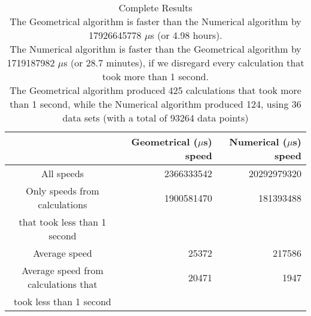 \begin{table}[bth!]\footnotesize
 \begin{tabular}[3]{c|r|r}
 & Geometrical ($\mu$s) speed & Numerical ($\mu$s) speed\\
\hline
All speeds & 2366333542 & 20292979320 \\ 
\hline 
Only speeds from calculations & 1900581470 & 181393488 \\ 
that took less than 1 second & & \\ 
\hline
Average speed & 25372 & 217586 \\
\hline
Average speed from calculations that & 20471 & 1947 \\ 
took less than 1 second & & \\ 
\end{tabular}\\ \\
\caption{Complete  Results\\
The Geometrical algorithm is faster than the Numerical algorithm by 17926645778 $\mu$s (or 4.98 hours).\\
The Numerical algorithm is faster than the Geometrical algorithm by 1719187982 $\mu$s (or 28.7 minutes), if we disregard every calculation that took more than 1 second.\\
The Geometrical algorithm produced 425 calculations that took more than 1 second, while the Numerical algorithm produced 124, using 36 data sets (with a total of 93264 data points)\\
}\label{total_speedtable}\end{table}